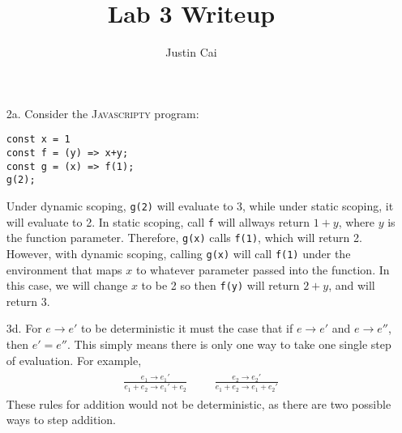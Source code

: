 \documentclass[11pt, letter]{article}
\title{Lab 3 Writeup}
\author{Justin Cai}
\begin{document}
    \maketitle

    \begin{itemize}
        \item [2a.] Consider the \textsc{Javascripty} program:
        \begin{verbatim}
const x = 1
const f = (y) => x+y;
const g = (x) => f(1);
g(2);
        \end{verbatim}
        Under dynamic scoping, \texttt{g(2)} will evaluate to 3, while under static 
        scoping, it will evaluate to 2. In static scoping, call \texttt{f} will allways 
        return \(1+y\), where \(y\) is the function parameter. Therefore, \texttt{g(x)}
        calls \texttt{f(1)}, which will return 2. However, with dynamic scoping, calling 
        \texttt{g(x)} will call \texttt{f(1)} under the environment that maps \(x\) to whatever
        parameter passed into the function. In this case, we will change \(x\) to be 
        2 so then \texttt{f(y)} will return \(2+y\), and will return 3.

        \item [3d.] For \(e\to e'\) to be deterministic it must the case that if \(e \to e'\) and \(e\to e''\), then \( e'=e''\).
        This simply means there is only one way to take one single step of evaluation. For example,
        \begin{align*}
            \begin{aligned}
                \frac{e_1\to e_1'}{e_1+e_2\to e_1'+e_2}
            \end{aligned}&&
            \begin{aligned}
                \frac{e_2\to e_2'}{e_1+e_2\to e_1+e_2'}
            \end{aligned}
        \end{align*}
        These rules for addition would not be deterministic, as there are two possible ways
        to step addition.


\end{itemize}
\end{document}
